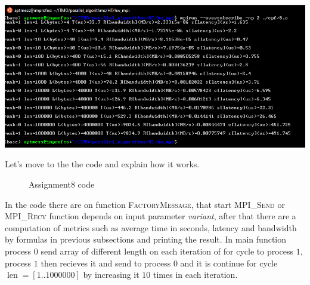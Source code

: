 \documentclass[%
12pt, %
final, %
oneside, %
onecolumn, %
centertags]{article} %
\theoremstyle{plain}
\theoremstyle{definition}
\theoremstyle{remark}
\begin{document}
\begin{center}
\includegraphics[scale=0.75]{8.png}
\end{center}

Let's move to the the code and explain how it works.

\begin{figure}[h!]
\centering
{} 

Assignment8 code
\end{figure}

In the code there are on function \textsc{FactoryMessage}, that start \textsc{MPI\_Send} or \textsc{MPI\_Recv} function depends on input parameter \textit{variant}, after that there are a computation of metrics such as average time in seconds, latency and bandwidth by formulas in previous subsections and printing the result. In main function process $0$ send array of different length on each iteration of for cycle to process $1$, process $1$ then recieves it and send to process $0$ and it is continue for cycle $\operatorname{len}=[1..1000000]$ by increasing it $10$ times in each iteration. 
\end{document}
